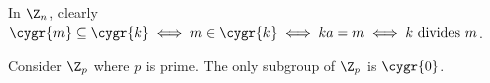 \begin{remark}
    In $\Z_n$, clearly $\cygr{m} \subseteq \cygr{k} \iff m \in \cygr{k} \iff ka = m \iff k \text{ divides } m$.
\end{remark}

\begin{example}[subgroups of $\Z_p$]
    Consider $\Z_p$ where $p$ is prime. The only subgroup of $\Z_p$ is $\cygr{0}$.
\end{example}